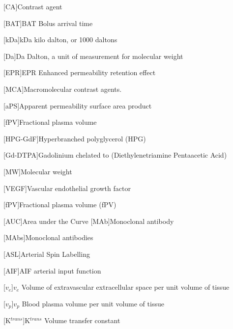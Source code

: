 \begin{acronym}
[CA]{Contrast agent}

[BAT]{BAT Bolus arrival time}

[kDa]{kDa kilo dalton, or 1000 daltons}

[Da]{Da Dalton, a unit of measurement for molecular weight}

[EPR]{EPR Enhanced permeability retention effect}

[MCA]{Macromolecular contrast agents.}

[aPS]{Apparent permeability surface area product}%

[fPV]{Fractional plasma volume}

[HPG-GdF]{Hyperbranched polyglycerol (HPG)}%

[Gd-DTPA]{Gadolinium chelated to (Diethylenetriamine Pentaacetic Acid)}%

[MW]{Molecular weight}

[VEGF]{Vascular endothelial growth factor}

[fPV]{Fractional plasma volume (fPV)}

[AUC]{Area under the Curve}%
[MAb]{Monoclonal antibody}

[MAbs]{Monoclonal antibodies}

[ASL]{Arterial Spin Labelling}

[AIF]{AIF arterial input function}

[$v_e$]{$v_e$ Volume of extravascular extracellular space per unit volume of tissue}

[$v_p$]{$v_p$ Blood plasma volume per unit volume of tissue}

[K$^{trans}$]{K$^{trans}$ Volume transfer constant}


\end{acronym}
